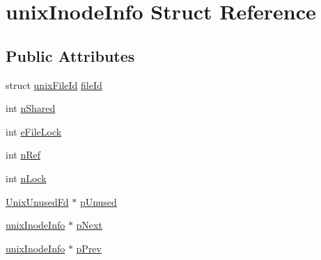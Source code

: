 \hypertarget{structunix_inode_info}{\section{unix\-Inode\-Info Struct Reference}
\label{d0/d86/structunix_inode_info}
}
\subsection*{Public Attributes}
\begin{DoxyCompactItemize}
\item 
struct \hyperlink{structunix_file_id}{unix\-File\-Id} \hyperlink{structunix_inode_info_ae692731d449f4462a921dda9a061faa6}{file\-Id}
\item 
int \hyperlink{structunix_inode_info_a0d7f8dd92964f53e59c8d741dbe00a61}{n\-Shared}
\item 
int \hyperlink{structunix_inode_info_a615196e91c97d2ebb0e41b54aeb7e59e}{e\-File\-Lock}
\item 
int \hyperlink{structunix_inode_info_a65cbd1fd05ed00f03a252266b04a8221}{n\-Ref}
\item 
int \hyperlink{structunix_inode_info_a477f3357a32adbc1a9b05017e535444d}{n\-Lock}
\item 
\hyperlink{struct_unix_unused_fd}{Unix\-Unused\-Fd} $\ast$ \hyperlink{structunix_inode_info_a0dda9ad35734fa161d1f0b13b671c1c6}{p\-Unused}
\item 
\hyperlink{structunix_inode_info}{unix\-Inode\-Info} $\ast$ \hyperlink{structunix_inode_info_a80181ba4ef71dd0d8e55e97baedc761e}{p\-Next}
\item 
\hyperlink{structunix_inode_info}{unix\-Inode\-Info} $\ast$ \hyperlink{structunix_inode_info_a6575edce9898b48870c6f48047c01d01}{p\-Prev}
\end{DoxyCompactItemize}


